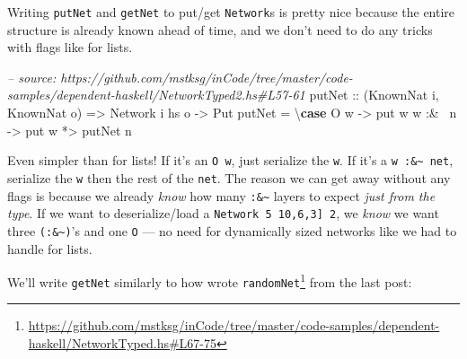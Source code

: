 \documentclass[]{article}
\newenvironment{Shaded}{}{}
\newcommand{\KeywordTok}[1]{\textcolor[rgb]{0.00,0.44,0.13}{\textbf{{#1}}}}
\newcommand{\DataTypeTok}[1]{\textcolor[rgb]{0.56,0.13,0.00}{{#1}}}
\newcommand{\CommentTok}[1]{\textcolor[rgb]{0.38,0.63,0.69}{\textit{{#1}}}}
\newcommand{\OtherTok}[1]{\textcolor[rgb]{0.00,0.44,0.13}{{#1}}}
\newcommand{\FunctionTok}[1]{\textcolor[rgb]{0.02,0.16,0.49}{{#1}}}
\newcommand{\NormalTok}[1]{{#1}}
\renewcommand{\href}[2]{#2\footnote{\url{#1}}}
\begin{document}
Writing \texttt{putNet} and \texttt{getNet} to put/get \texttt{Network}s is
pretty nice because the entire structure is already known ahead of time, and we
don't need to do any tricks with flags like for lists.

\begin{Shaded}
\begin{Highlighting}[]
\CommentTok{-- source: https://github.com/mstksg/inCode/tree/master/code-samples/dependent-haskell/NetworkTyped2.hs#L57-61}
\OtherTok{putNet ::} \NormalTok{(}\DataTypeTok{KnownNat} \NormalTok{i, }\DataTypeTok{KnownNat} \NormalTok{o)}
       \OtherTok{=>} \DataTypeTok{Network} \NormalTok{i hs o}
       \OtherTok{->} \DataTypeTok{Put}
\NormalTok{putNet }\FunctionTok{=} \NormalTok{\textbackslash{}}\KeywordTok{case} \DataTypeTok{O} \NormalTok{w     }\OtherTok{->} \NormalTok{put w}
               \NormalTok{w }\FunctionTok{:&~} \NormalTok{n }\OtherTok{->} \NormalTok{put w }\FunctionTok{*>} \NormalTok{putNet n}
\end{Highlighting}
\end{Shaded}

Even simpler than for lists! If it's an \texttt{O\ w}, just serialize the
\texttt{w}. If it's a \texttt{w\ :\&\textasciitilde{}\ net}, serialize the
\texttt{w} then the rest of the \texttt{net}. The reason we can get away without
any flags is because we already \emph{know} how many
\texttt{:\&\textasciitilde{}} layers to expect \emph{just from the type}. If we
want to deserialize/load a
\texttt{Network\ 5\ \textquotesingle{}{[}10,6,3{]}\ 2}, we \emph{know} we want
three \texttt{(:\&\textasciitilde{})}'s and one \texttt{O} --- no need for
dynamically sized networks like we had to handle for lists.

We'll write \texttt{getNet} similarly to how wrote
\href{https://github.com/mstksg/inCode/tree/master/code-samples/dependent-haskell/NetworkTyped.hs\#L67-75}{\texttt{randomNet}}
from the last post:

\begin{Shaded}
\end{Shaded}
\end{document}
